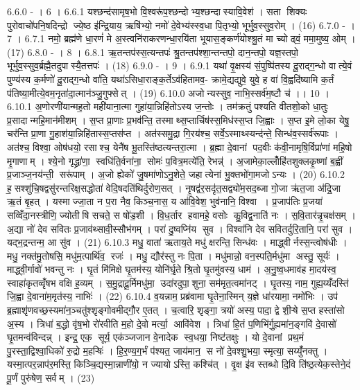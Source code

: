6.6.0
- । 6 ।
6.6.1
यश्छन्द॑सामृष॒भो वि॒श्वरू॑प॒श्छन्दोभ्य॒श्छन्दा॑स्यावि॒वेश॑ । सता शिक्यः पुरोवाचो॑पनि॒षदिन्द्रो ज्ये॒ष्ठ इ॑न्द्रि॒याय॒ ऋषि॑भ्यो॒ नमो॑ दे॒वेभ्य॑स्स्व॒धा पि॒तृभ्यो॒ भूर्भुव॒स्सुव॒रोम् । (16)
6.7.0
- । 7 ।
6.7.1
नमो॒ ब्रह्म॑णे धा॒रणं॑ मे अ॒स्त्वनि॑राकरणन्धा॒रयि॑ता भूयास॒ङ्कर्ण॑योश्श्रु॒तं मा च्योढ्वं॒ ममा॒मुष्य॒ ओम् । (17)
6.8.0
- । 8 ।
6.8.1
ऋ॒तन्तप॑स्स॒त्यन्तपः॑ श्रु॒तन्तप॑श्शा॒न्तन्तपो॒ दान॒न्तपो॒ यज्ञ॒स्तपो॒ भूर्भुव॒स्सुव॒र्ब्रह्मै॒तदुपास्यै॒तत्तपः॑ । (18)
6.9.0
- । 9 ।
6.9.1
यथा॑ वृ॒क्षस्य॑ सं॒पुष्पि॑तस्य दू॒राद्ग॒न्धो वात्ये॒वं पुण्य॑स्य क॒र्मणो॑ दू॒राद्ग॒न्धो वा॑ति॒ यथा॑ऽसिधा॒राङ्क॒र्तेऽव॑हितामव॒- क्रामे॒द्यद्युवे॒ युवे॒ ह वा॑ वि॒ह्वदि॑ष्यामि क॒र्तं प॑तिष्या॒मीत्ये॒वम॒नृता॑दा॒त्मान॑ञ्जु॒गुफ्सेत् । (19)
6.10.0
अजोन्यस्सुव॒ नाभि॒स्सर्व॑म॒ष्टौ च॑ ।। 10 ।
6.10.1
अ॒णोरणी॑यान्मह॒तो मही॑याना॒त्मा गुहा॑या॒न्निहि॑तोऽस्य ज॒न्तोः । तम॑क्रतुं पश्यति वीतशो॒को धा॒तुः प्र॒सादान्महि॒मान॑मीशम् । स॒प्त प्रा॒णाः प्र॒भव॑न्ति॒ तस्माथ्स॒प्तार्चिष॑स्स॒मिध॑स्स॒प्त जि॒ह्वाः । स॒प्त इ॒मे लो॒का येषु॒ चर॑न्ति प्रा॒णा गु॒हाश॑या॒न्निहि॑तास्स॒प्तस॑प्त । अत॑स्समु॒द्रा गि॒रय॑श्च॒ सर्वे॒ऽस्माथ्स्यन्द॑न्ते॒ सिन्ध॑व॒स्सर्व॑रूपाः । अत॑श्च॒ विश्वा॒ ओष॑धयो॒ रसाश्च॒ येनै॑ष भू॒तस्ति॑ष्ठत्यन्तरा॒त्मा । ब्र॒ह्मा दे॒वानां पद॒वीः क॑वी॒नामृषि॒र्विप्रा॑णां महि॒षो मृ॒गाणाम् । श्ये॒नो गृद्ध्रा॑णा॒॒ स्वधि॑ति॒र्वना॑ना॒॒ सोमः॑ प॒वित्र॒मत्ये॑ति॒ रेभन्न्॑ । अ॒जामेका॒ल्लोँहि॑तशुक्लकृ॒ष्णां ब॒ह्वीं प्र॒जाञ्ज॒नय॑न्ती॒॒ सरू॑पाम् । अ॒जो ह्येको॑ जु॒षमा॑णोऽनु॒शेते॒ जहात्येनां भु॒क्तभो॑गा॒मजोऽन्यः । (20)
6.10.2
ह॒॒सश्शु॑चि॒षद्वसु॑रन्तरिक्ष॒सद्धोता॑ वेदि॒षदति॑थिर्दुरोण॒सत् । नृ॒षद्व॑र॒सदृ॑त॒सद्व्यो॑म॒सद॒ब्जा गो॒जा ऋ॑त॒जा अ॑द्रि॒जा ऋ॒तं बृ॒हत् । यस्माज्जा॒ता न प॒रा नैव॒ किञ्च॒नास॒ य आ॑वि॒वेश॒ भुव॑नानि॒ विश्वा । प्र॒जाप॑तिः प्र॒जया॑ सव्विँदा॒नस्त्रीणि॒ ज्योती॑षि सचते॒ स षो॑ड॒शी । वि॒ध॒र्तार॑ हवामहे॒ वसोः कु॒विद्व॒नाति॑ नः । स॒वि॒तार॑न्नृ॒चक्ष॑सम् । अ॒द्या नो॑ देव सवितः प्र॒जाव॑थ्सावी॒स्सौभ॑गम् । परा॑ दु॒ष्वप्नि॑य सुव । विश्वा॑नि देव सवितर्दुरि॒तानि॒ परा॑ सुव । यद्भ॒द्रन्तन्म॒ आ सु॑व । (21)
6.10.3
मधु॒ वाता॑ ऋताय॒ते मधु॑ क्षरन्ति॒ सिन्ध॑वः । माद्ध्वीर्नस्स॒न्त्वोष॑धीः । मधु॒ नक्त॑मु॒तोषसि॒ मधु॑म॒त्पार्थि॑व॒॒ रजः॑ । मधु॒ द्यौर॑स्तु नः पि॒ता । मधु॑मान्नो॒ वन॒स्पति॒र्मधु॑मा अस्तु॒ सूर्यः॑ । माद्ध्वी॒र्गावो॑ भवन्तु नः । घृ॒तं मि॑मिक्षे घृ॒तम॑स्य॒ योनि॑र्घृ॒ते श्रि॒तो घृ॒तमु॑वस्य॒ धाम॑ । अ॒नु॒ष्व॒धमाव॑ह मा॒दय॑स्व॒ स्वाहा॑कृतव्वृँषभ वक्षि ह॒व्यम् । स॒मु॒द्रादू॒र्मिमधु॑मा॒॒ उदा॑रदुपा॒॒शुना॒ सम॑मृत॒त्वमा॑नट् । घृ॒तस्य॒ नाम॒ गुह्य॒य्यँदस्ति॑ जि॒ह्वा दे॒वाना॑म॒मृत॑स्य॒ नाभिः॑ । (22)
6.10.4
व॒यन्नाम॒ प्रब्र॑वामा घृ॒तेना॒स्मिन् य॒ज्ञे धा॑रयामा॒ नमो॑भिः । उप॑ ब्र॒ह्माशृ॑णवच्छ॒स्यमा॑न॒ञ्चतु॑श्शृङ्गोवमीद्गौ॒र ए॒तत् । च॒त्वारि॒ शृङ्गा॒ त्रयो॑ अस्य॒ पादा॒ द्वे शी॒ऱ्षे स॒प्त हस्ता॑सो अ॒स्य । त्रिधा॑ ब॒द्धो वृ॑ष॒भो रो॑रवीति म॒हो दे॒वो मर्त्या॒॒ आवि॑वेश । त्रिधा॑ हि॒तं प॒णिभि॑र्गु॒ह्यमा॑न॒ङ्गवि॑ दे॒वासो॑ घृ॒तमन्व॑विन्दन्न् । इन्द्र॒ एक॒॒ सूर्य॒ एक॑ञ्जजान वे॒नादेक॑ स्व॒धया॒ निष्ट॑तक्षुः । यो दे॒वानां प्रथ॒मं पु॒रस्ता॒द्विश्वा॒धिको॑ रु॒द्रो म॒हऱ्षिः॑ । हि॒र॒ण्य॒ग॒र्भं प॑श्यत॒ जाय॑मान॒॒ स नो॑ दे॒वश्शु॒भया॒ स्मृत्या॒ सय्युँ॑नक्तु । यस्मा॒त्पर॒न्नाप॑र॒मस्ति॒ किञ्चि॒द्यस्मा॒न्नाणी॑यो॒ न ज्यायोऽस्ति॒ कश्चि॑त् । वृ॒क्ष इ॑व स्तब्धो दि॒वि ति॑ष्ठ॒त्येक॒स्तेने॒दं पू॒र्णं पुरु॑षेण॒ सर्वम् । (23)
